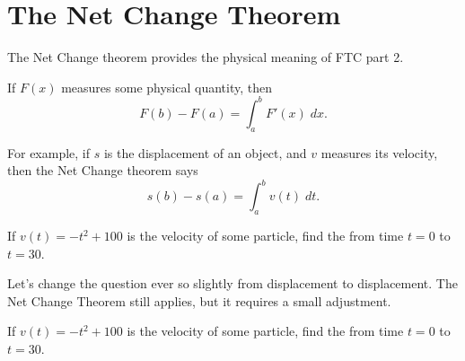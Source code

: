 \documentclass[../main.tex]{subfiles}
\begin{document}
 \section{The Net Change Theorem}
  The Net Change theorem provides the physical meaning of FTC part 2.

  \begin{mdframed}[style=withref-compact]
    If \(F(x)\) measures some physical quantity, then 
    \[
      F(b) - F(a) = \int_{a}^{b} F'(x) \;dx.
    \]

  \end{mdframed}

  For example, if \(s\) is the displacement of an object, and \(v\) measures its velocity, then the Net Change theorem says 
  \[
    s(b) - s(a) = \int_{a}^{b} v(t) \;dt.
  \]

  \begin{example}
    If \(v(t) = -t^{2} + 100\) is the velocity of some particle, find the  from time \(t = 0\) to \(t = 30\).
  \end{example}
  \clearpage

  Let's change the question ever so slightly from  displacement to  displacement. The Net Change Theorem still applies, but it requires a small adjustment.
  \begin{example}
    If \(v(t) = -t^{2} + 100\) is the velocity of some particle, find the  from time \(t = 0\) to \(t = 30\).
  \end{example}
\end{document}
